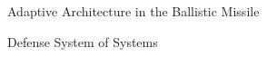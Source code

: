 \vspace{180mm}

{
\Large
\bf
\centerline{Adaptive Architecture in the Ballistic Missile}
\centerline{Defense System of Systems}
}
